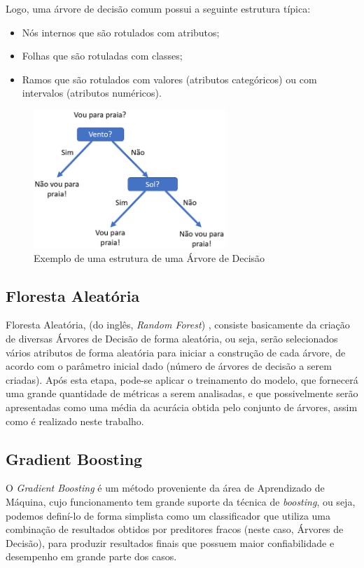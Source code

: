 \documentclass[12pt]{article}
\begin{document}
\noindent Logo, uma árvore de decisão comum possui a seguinte estrutura típica:

\begin{itemize}
    \item Nós internos que são rotulados com atributos;
    \item Folhas que são rotuladas com classes;
    \item Ramos que são rotulados com valores (atributos categóricos) ou com intervalos (atributos numéricos).
\end{itemize}

\begin{figure}[ht]
    \centering
    \includegraphics[width=7.3cm]{Images/image-5.png}
    \caption{Exemplo de uma estrutura de uma Árvore de Decisão}
    \label{fig:exampleFig1}
\end{figure}

\subsection{Floresta Aleatória}

Floresta Aleatória, (do inglês, \emph{Random Forest}) \cite{breiman2001random}, consiste basicamente da criação de diversas Árvores de Decisão de forma aleatória, ou seja, serão selecionados vários atributos de forma aleatória para iniciar a construção de cada árvore, de acordo com o parâmetro inicial dado (número de árvores de decisão a serem criadas). Após esta etapa, pode-se aplicar o treinamento do modelo, que fornecerá uma grande quantidade de métricas a serem analisadas, e que possivelmente serão apresentadas como uma média da acurácia obtida pelo conjunto de árvores, assim como é realizado neste trabalho.

\subsection{Gradient Boosting}

O \emph{Gradient Boosting} \cite{Friedman:99} é um método proveniente da área de Aprendizado de Máquina, cujo funcionamento tem grande suporte da técnica de \emph{boosting}, ou seja, podemos definí-lo de forma simplista como um classificador que utiliza uma combinação de resultados obtidos por preditores fracos (neste caso, Árvores de Decisão), para produzir resultados finais que possuem maior confiabilidade e desempenho em grande parte dos casos.
\end{document}
